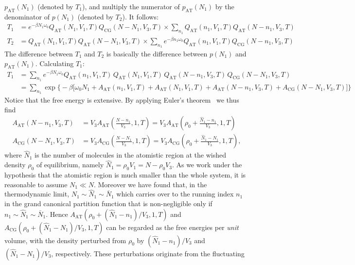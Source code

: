 \documentclass[aip,jcp,a4paper,reprint,onecolumn]{revtex4-1}
\newcommand{\AT}{{\textrm{{AT}}}}
\newcommand{\CG}{{\textrm{CG}}}
\begin{document}
$p_{\AT}(N_1)$ (denoted by $T_1$),
and multiply the numerator of $p_{\AT}(N_1)$
by the denominator of $p(N_1)$ (denoted by $T_2$). It follows:
\begin{align}
  T_1
  &=
  e^{-\beta N_1\omega_0}
  Q_{\AT}(N_1,V_1,T) Q_{\CG}(N-N_1,V_3,T)
  \times
  \sum_{n_1}
  Q_{\AT}(n_1,V_1,T) Q_{\AT}(N-n_1,V_3,T)\\
  T_2
  &=
  Q_{\AT}(N_1,V_1,T) Q_{\AT}(N-N_1,V_3,T)
  \times
  \sum_{n_1}
  e^{-\beta n_1\omega_0}
  Q_{\AT}(n_1,V_1,T) Q_{\CG}(N-n_1,V_3,T)
\end{align}
The difference between $T_1$ and $T_2$ is basically the difference
between $p(N_1)$ and $p_{\AT}(N_1)$.
Calculating $T_1$:
\begin{align}\nonumber
  T_1
  &=
  \sum_{n_1}
  e^{-\beta N_1\omega_0}
  Q_{\AT}(n_1,V_1,T)\,
  Q_{\AT}(N_1,V_1,T)\,
  Q_{\AT}(N-n_1,V_3,T)\,
  Q_{\CG}(N-N_1,V_3,T) \\\label{eqn:t1-1}
  &=
  \sum_{n_1}
  \exp
  \big\{-\beta
  \big[
  \omega_0N_1 +
  A_{\AT}(n_1,V_1,T) +
  A_{\AT}(N_1,V_1,T) +
  A_{\AT}(N-n_1,V_3,T) +
  A_{\CG}(N-N_1,V_3,T)
  \big]
  \big\}
\end{align}
Notice that the free energy is extensive.
By applying Euler's theorem~\cite{tuckeman2010statistical} we thus find 
\begin{align}\label{eqn:Aat-0}
  A_{\AT}(N-n_1,V_3,T)
  &= V_3 A_{\AT}(\frac{N-n_1}{V_3},1,T)
  = V_3 A_{\AT}(\rho_0 + \frac{\hat N_1 - n_1}{V_3},1,T)\\\label{eqn:Acg-0}
  A_{\CG}(N-N_1,V_3,T)
  &= V_3 A_{\CG}(\frac{N-N_1}{V_3},1,T)
  = V_3 A_{\CG}(\rho_0 + \frac{\hat N_1 - N_1}{V_3},1,T),
\end{align}
where $\hat N_1$ is the number of molecules in the atomistic region
at the wished density $\rho_0$ of equilibrium, namely
$\hat N_1 = \rho_0V_1 = N - \rho_0 V_3$. As we work under the hypothesis that the atomistic region is much smaller than the whole system, it
is reasonable to assume $N_1\ll N$. Moreover we have found that, in the thermodynamic limit, $N_{1}\sim\hat N_1\sim\bar N_1$ which carries over to the running index $n_{1}$  in the grand canonical partition function that is non-negligible only if $n_{1}\sim\hat N_1\sim\bar N_1$. Hence 
$A_{\AT}(\rho_0 + (\hat N_1 - n_1)/{V_3},1,T)$ and
$A_{\CG}(\rho_0 + (\hat N_1 - N_1)/{V_3},1,T)$ can be regarded as
the free energies per \emph{unit} volume, with
the density perturbed from $\rho_0$ by  $(\hat N_1 - n_1)/{V_3}$
and $(\hat N_1 - N_1)/{V_3}$, respectively.
These perturbations originate from the fluctuating
\end{document}
